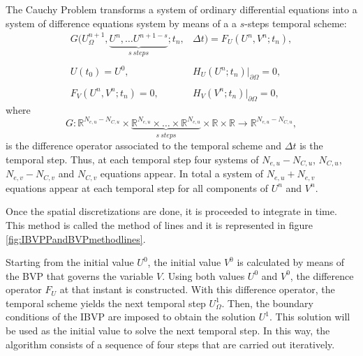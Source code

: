  The Cauchy Problem transforms a system of ordinary differential equations  into a system of difference equations system by means of a  a $s$-steps temporal scheme:
        \begin{align*}
        G({U}_{\Omega}^{n+1}, \underbrace{ {U}^{n}, \ldots {U}^{n+1-s}}_{s \ steps};t_n, & \Delta t)=  {F}_U({U}^n,V^n;t_n),   \\ \\
        {U}(t_0)={U}^0 , \qquad & {H}_U({U}^n;t_n)\big\rvert_{\partial \Omega}=0,   \\ \\
        {F}_V({U}^n,V^n;t_n)=0, \qquad & {H}_V({V}^n;t_n)\big\rvert_{\partial \Omega}=0,
        \end{align*}
 where 
        \begin{equation*}
        	{G}: \mathbb{ R}^{N_{e,u}-N_{C,u}} \times \underbrace{\mathbb{ R}^{N_{e,u}} \times  \ldots \times \mathbb{ R}^{N_{e,u}}}_{s \ steps} \times\mathbb{ R} \times \mathbb{ R}\rightarrow \mathbb{R}^{N_{e,u}-N_{C,u}},
        \end{equation*} 
 is the difference operator associated to the temporal scheme and $\Delta t$ is the temporal step. Thus, at each temporal step four  systems of $N_{e,u}-N_{C,u}$, $N_{C,u}$,  $N_{e,v}-N_{C,v}$ and $N_{C,v}$ equations appear. In total a system of $N_{e,u}+N_{e,v}$ equations appear at each temporal step for all components of $U^n$ and $V^n$.
        
 Once the spatial discretizations are done, it is proceeded to integrate in time. This method is called the method of lines and it is represented in figure \ref{fig:IBVPPandBVPmethodlines}.
        
        \newpage
        
        \IBVPandBVPmethodlines 
        
 Starting from the initial value $U^0$, the initial value $V^0$ is calculated by means of the BVP that governs the variable $ V $. 
 Using both values $U^0$ and $V^0$, the difference operator $F_U$ at that instant is constructed.  With this difference operator, the temporal scheme yields the next temporal step ${U}_{\Omega}^{1}$. Then, the boundary conditions of the IBVP  are imposed to obtain the solution $U^1$. This solution will be used as the initial value to solve the next temporal step. In this way, the algorithm consists of a sequence of four steps that are carried out iteratively.
 
 
         
